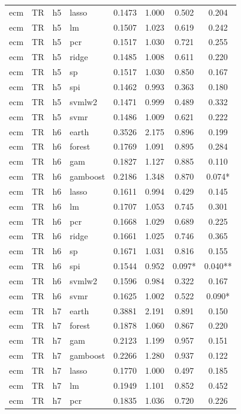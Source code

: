 \begin{ThreePartTable}
\begin{longtable}[t]{llclcccc}
ecm & TR & h5 & lasso & 0.1473 & 1.000 & 0.502 & 0.204\\
ecm & TR & h5 & lm & 0.1507 & 1.023 & 0.619 & 0.242\\
ecm & TR & h5 & pcr & 0.1517 & 1.030 & 0.721 & 0.255\\
ecm & TR & h5 & ridge & 0.1485 & 1.008 & 0.611 & 0.220\\
ecm & TR & h5 & sp & 0.1517 & 1.030 & 0.850 & 0.167\\
ecm & TR & h5 & spi & 0.1462 & 0.993 & 0.363 & 0.180\\
ecm & TR & h5 & svmlw2 & 0.1471 & 0.999 & 0.489 & 0.332\\
ecm & TR & h5 & svmr & 0.1486 & 1.009 & 0.621 & 0.222\\
\addlinespace
ecm & TR & h6 & earth & 0.3526 & 2.175 & 0.896 & 0.199\\
ecm & TR & h6 & forest & 0.1769 & 1.091 & 0.895 & 0.284\\
ecm & TR & h6 & gam & 0.1827 & 1.127 & 0.885 & 0.110\\
ecm & TR & h6 & gamboost & 0.2186 & 1.348 & 0.870 & 0.074*\\
ecm & TR & h6 & lasso & 0.1611 & 0.994 & 0.429 & 0.145\\
ecm & TR & h6 & lm & 0.1707 & 1.053 & 0.745 & 0.301\\
ecm & TR & h6 & pcr & 0.1668 & 1.029 & 0.689 & 0.225\\
ecm & TR & h6 & ridge & 0.1661 & 1.025 & 0.746 & 0.365\\
ecm & TR & h6 & sp & 0.1671 & 1.031 & 0.816 & 0.155\\
ecm & TR & h6 & spi & 0.1544 & 0.952 & 0.097* & 0.040**\\
ecm & TR & h6 & svmlw2 & 0.1596 & 0.984 & 0.322 & 0.167\\
ecm & TR & h6 & svmr & 0.1625 & 1.002 & 0.522 & 0.090*\\
\addlinespace
ecm & TR & h7 & earth & 0.3881 & 2.191 & 0.891 & 0.150\\
ecm & TR & h7 & forest & 0.1878 & 1.060 & 0.867 & 0.220\\
ecm & TR & h7 & gam & 0.2123 & 1.199 & 0.957 & 0.151\\
ecm & TR & h7 & gamboost & 0.2266 & 1.280 & 0.937 & 0.122\\
ecm & TR & h7 & lasso & 0.1770 & 1.000 & 0.497 & 0.185\\
ecm & TR & h7 & lm & 0.1949 & 1.101 & 0.852 & 0.452\\
ecm & TR & h7 & pcr & 0.1835 & 1.036 & 0.720 & 0.226\\

\end{longtable}
\end{ThreePartTable}
